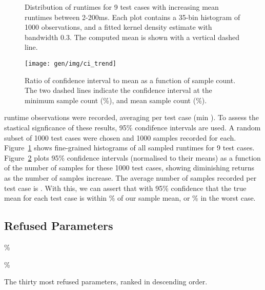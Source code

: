 \begin{figure}

\caption{%
  Distribution of runtimes for 9 test cases with increasing mean
  runtimes between 2-200ms. Each plot contains a 35-bin histogram of
  1000 observations, and a fitted kernel density estimate with
  bandwidth 0.3. The computed mean is shown with a vertical dashed
  line. %
}
\label{fig:runtime-histograms}
\end{figure}


\begin{figure}
\centering
\texttt{[image: gen/img/ci\_trend]}
\caption{%
  Ratio of confidence interval to mean as a function of sample
  count. The two dashed lines indicate the confidence interval at the
  minimum sample count (\%), and mean sample count
  (\%).%
}
\label{fig:ci-trends}
\end{figure}


 runtime observations were recorded, averaging
 per test case (min
). To assess the stastical signficance of
these results, 95\% condifence intervals are used. A random subset of
1000 test cases were chosen and 1000 samples recorded for
each. Figure~\ref{fig:runtime-histograms} shows fine-grained
histograms of all sampled runtimes for 9 test
cases. Figure~\ref{fig:ci-trends} plots 95\% confidence intervals
(normalised to their means) as a function of the number of samples for
these 1000 test cases, showing diminishing returns as the number of
samples increase. The average number of samples recorded per test case
is . With this, we can assert that with
95\% confidence that the true mean for each test case is within
\% of our sample mean, or \% in
the worst case.


\subsection{Refused Parameters}



\%

\%

\begin{table}
\parbox{.32\linewidth}{
    \centering
    \scriptsize
    
  }
  \hfill
  \parbox{.32\linewidth}{
    \centering
    \scriptsize
    
  }
  \hfill
  \parbox{.32\linewidth}{
    \centering
    \scriptsize
    
  }
  \caption{The thirty most refused parameters, ranked in descending order.}
\end{table}


